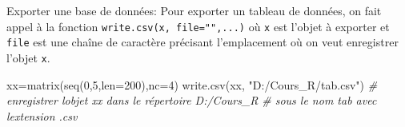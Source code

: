 \documentclass[
  8pt,
  ignorenonframetext,
]{beamer}
\newenvironment{Shaded}{\begin{snugshade}}{\end{snugshade}}
\newcommand{\AttributeTok}[1]{\textcolor[rgb]{0.77,0.63,0.00}{#1}}
\newcommand{\CommentTok}[1]{\textcolor[rgb]{0.56,0.35,0.01}{\textit{#1}}}
\newcommand{\DecValTok}[1]{\textcolor[rgb]{0.00,0.00,0.81}{#1}}
\newcommand{\FunctionTok}[1]{\textcolor[rgb]{0.00,0.00,0.00}{#1}}
\newcommand{\NormalTok}[1]{#1}
\newcommand{\OtherTok}[1]{\textcolor[rgb]{0.56,0.35,0.01}{#1}}
\newcommand{\StringTok}[1]{\textcolor[rgb]{0.31,0.60,0.02}{#1}}
\begin{document}
\begin{frame}[fragile]{Exporter une base de données:}
\protect\hypertarget{exporter-une-base-de-donnuxe9es}{}
Pour exporter un tableau de données, on fait appel à la fonction
\texttt{write.csv(x,\ file="",...)} où \texttt{x} est l'objet à exporter
et \texttt{file} est une chaîne de caractère précisant l'emplacement où
on veut enregistrer l'objet \texttt{x}.

\begin{Shaded}
\begin{Highlighting}[]
\NormalTok{xx}\OtherTok{=}\FunctionTok{matrix}\NormalTok{(}\FunctionTok{seq}\NormalTok{(}\DecValTok{0}\NormalTok{,}\DecValTok{5}\NormalTok{,}\AttributeTok{len=}\DecValTok{200}\NormalTok{),}\AttributeTok{nc=}\DecValTok{4}\NormalTok{)}
\FunctionTok{write.csv}\NormalTok{(xx, }\StringTok{"D:/Cours\_R/tab.csv"}\NormalTok{)}
\CommentTok{\# enregistrer l\textquotesingle{}objet xx dans le répertoire D:/Cours\_R }
\CommentTok{\# sous le nom tab avec l\textquotesingle{}extension .csv}
\end{Highlighting}
\end{Shaded}
\end{frame}
\end{document}
